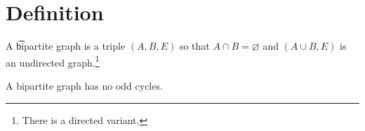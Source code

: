 
\section*{Definition}

A \t{bipartite graph} is a triple $(A, B, E)$ so that $A \cap  B = \varnothing$ and $(A \cup B, E)$ is an undirected graph.\footnote{There is a directed variant.}

\begin{proposition}
A bipartite graph has no odd cycles.
\end{proposition}

\blankpage